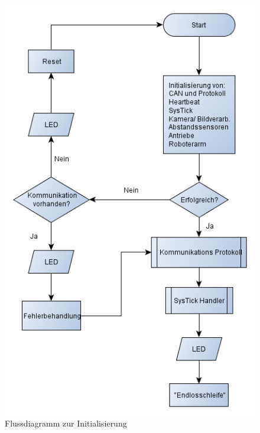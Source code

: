 \begin{figure}[H]
\centering
  \begin{minipage}[b]{0.49\linewidth}
    \includegraphics[width=\linewidth]{Bilder/FaTNet_init} 
    \caption{Flussdiagramm zur Initialisierung}
    \label{fig:init}
  \end{minipage}
  \begin{minipage}[b]{0.49\linewidth}

\end{minipage}
\end{figure}
